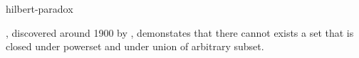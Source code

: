 \documentclass{stex}
\begin{document}
\begin{smodule}{hilbert-paradox}
\begin{sparagraph}[style=symdoc]
  , discovered around 1900 by , demonstates that there cannot exists a set that is closed under powerset and under union of arbitrary subset.
\end{sparagraph}
\end{smodule}
\end{document}
